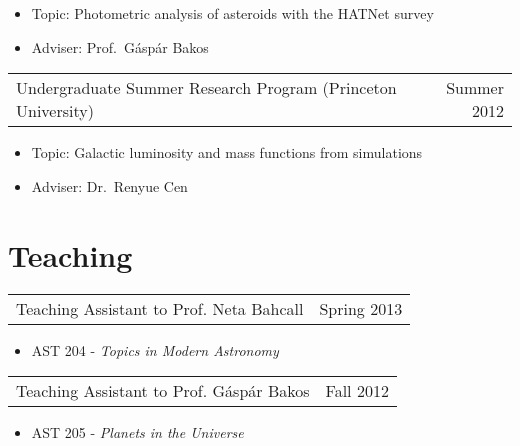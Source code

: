 \documentclass[margin]{res}
\begin{document}
\begin{resume}
\begin{itemize}
				 \item[] Topic: Photometric analysis
                                   of asteroids with the HATNet survey
				 \item[] Adviser: Prof.~G\'asp\'ar Bakos
				 \end{itemize}
				 \begin{tabular}{@{}p{4in} r}
				 Undergraduate Summer Research Program
                                 (Princeton University) & Summer 2012
				 \end{tabular}
				 \begin{itemize} \itemsep -2pt
				 \item[] Topic: Galactic luminosity
                                   and mass functions from simulations
				 \item[] Adviser: Dr.~Renyue Cen
				 \end{itemize}
				 
\normalsize{\section{Teaching}}
				 \begin{tabular}{@{}p{4in} r}
				 Teaching Assistant to Prof. Neta
                                 Bahcall & Spring 2013
				 \end{tabular}
				 \begin{itemize}
				 \item[] AST 204 - \textit{Topics in
                                   Modern Astronomy}
				 \end{itemize}
				 
				 \begin{tabular}{@{}p{4in} r}
				 Teaching Assistant to
                                 Prof. G\'asp\'ar Bakos & Fall 2012
				 \end{tabular}
				 \begin{itemize}
				 \item[] AST 205 - \textit{Planets in
                                   the Universe}
				 \end{itemize}

\end{resume}
\end{document}
